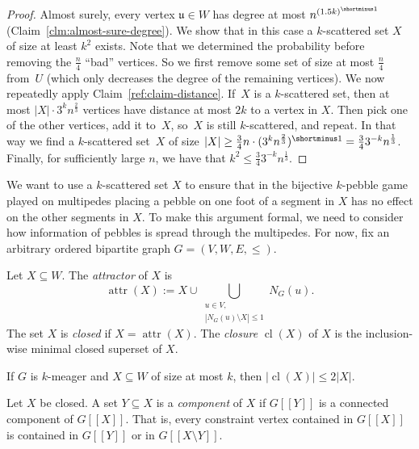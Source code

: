 \documentclass[]{lmcs}
\newcommand{\defining}[1]{\emph{#1}}
\newcommand{\vertA}{u}
\newcommand{\neighbors}[2]{N_{#1}(#2)}
\newcommand{\inv}[1]{#1^{\shortminus 1}}
\newcommand{\bVertA}{\mathfrak{u}}
\newcommand{\gadgetsb}{V}
\newcommand{\feetb}{W}
\newcommand{\footbset}{X}
\newcommand{\footbsetB}{Y}
\newcommand{\attractor}[1]{\operatorname{attr}(#1)}
\newcommand{\closure}[1]{\operatorname{cl}(#1)}
\newcommand{\footinduced}[2]{#1[[#2]]}
\begin{document}
\begin{proof}
	Almost surely, every vertex $\bVertA \in \feetb$ has degree at most $n^{\inv{(1.5k)}}$ (Claim~\ref{clm:almost-sure-degree}).
	We show that in this case a $k$-scattered set $\footbset$ of size at least $k^2$ exists.
	Note that we determined the probability before removing the $\frac{n}{4}$
	``bad'' vertices.
	So we first remove some set of size at most $\frac{n}{4}$ from~$U$
	(which only decreases the degree of the remaining vertices).
	We now repeatedly apply Claim~\ref{ref:claim-distance}.
	If~$\footbset$ is a $k$-scattered set, then at most $|\footbset| \cdot 3^kn^{\frac{2}{3}}$ vertices have distance at most $2k$ to a vertex in $\footbset$.
	Then pick one of the other vertices, add it to~$\footbset$, so~$\footbset$ is still $k$-scattered, and repeat.
	In that way we find a $k$-scattered set~$\footbset$
	of size $|\footbset| \geq \frac{3}{4}n \cdot \inv{(3^kn^{\frac{2}{3}})} = \frac{3}{4}3^{-k}n^{\frac{1}{3}}$.
	Finally, for sufficiently large $n$, we have that $k^2 \leq \frac{3}{4}3^{-k}n^{\frac{1}{3}}$.
\end{proof}


We want to use a $k$-scattered set $\footbset$ to ensure that
in the bijective $k$-pebble game played on multipedes 
placing a pebble on one foot of a segment in $\footbset$ has no effect on the other segments in $\footbset$.
To make this argument formal, we need to consider how information of pebbles is spread through the multipedes.
For now, fix an arbitrary ordered bipartite graph $G=(\gadgetsb,\feetb, E, \leq)$.

\begin{defi}[Closure]
	Let $\footbset \subseteq \feetb$.
	The \defining{attractor} of $\footbset$ is
	\[\attractor{\footbset} := \footbset \cup \bigcup_{\substack{\vertA \in \gadgetsb,\\ |\neighbors{G}{\vertA} \setminus \footbset| \leq 1}} \neighbors{G}{\vertA}. \]
	The set $\footbset$ is \defining{closed}
	if $\footbset = \attractor{\footbset}$.
	The \defining{closure} $\closure{\footbset}$
	of $\footbset$ is the inclusion-wise minimal closed superset of $\footbset$.
\end{defi}

\begin{lemC}
	\label{lem:closure-meager-size}
	If $G$ is $k$-meager and $\footbset \subseteq \feetb$ of size at most $k$,
	then $|\closure{\footbset}| \leq 2|\footbset|$.
\end{lemC}


Let $\footbset$ be closed.
A set $\footbsetB \subseteq \footbset$ is a \defining{component} of $\footbset$
if $\footinduced{G}{\footbsetB}$
is a connected component of $\footinduced{G}{\footbset}$.
That is, every constraint vertex contained in $\footinduced{G}{\footbset}$ is contained in $\footinduced{G}{\footbsetB}$ or in $\footinduced{G}{\footbset \setminus \footbsetB}$.
\end{document}
